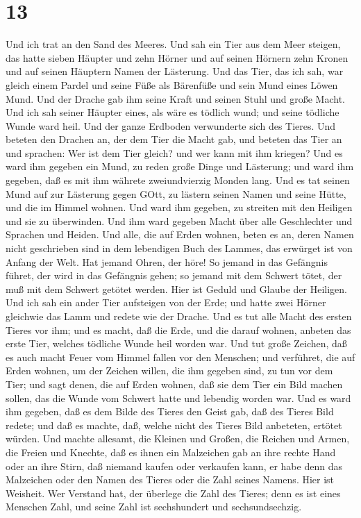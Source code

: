 \hypertarget{section-11}{%
\section{13}\label{section-11}}

 Und ich trat an den Sand des Meeres. Und sah ein Tier aus
dem Meer steigen, das hatte sieben Häupter und zehn Hörner und auf
seinen Hörnern zehn Kronen und auf seinen Häuptern Namen der Lästerung.
 Und das Tier, das ich sah, war gleich einem Pardel und
seine Füße als Bärenfüße und sein Mund eines Löwen Mund. Und der Drache
gab ihm seine Kraft und seinen Stuhl und große Macht.  Und
ich sah seiner Häupter eines, als wäre es tödlich wund; und seine
tödliche Wunde ward heil. Und der ganze Erdboden verwunderte sich des
Tieres.  Und beteten den Drachen an, der dem Tier die Macht
gab, und beteten das Tier an und sprachen: Wer ist dem Tier gleich? und
wer kann mit ihm kriegen?  Und es ward ihm gegeben ein Mund,
zu reden große Dinge und Lästerung; und ward ihm gegeben, daß es mit ihm
währete zweiundvierzig Monden lang.  Und es tat seinen Mund
auf zur Lästerung gegen GOtt, zu lästern seinen Namen und seine Hütte,
und die im Himmel wohnen.  Und ward ihm gegeben, zu streiten
mit den Heiligen und sie zu überwinden. Und ihm ward gegeben Macht über
alle Geschlechter und Sprachen und Heiden.  Und alle, die
auf Erden wohnen, beten es an, deren Namen nicht geschrieben sind in dem
lebendigen Buch des Lammes, das erwürget ist von Anfang der Welt.
 Hat jemand Ohren, der höre!  So jemand in das
Gefängnis führet, der wird in das Gefängnis gehen; so jemand mit dem
Schwert tötet, der muß mit dem Schwert getötet werden. Hier ist Geduld
und Glaube der Heiligen.  Und ich sah ein ander Tier
aufsteigen von der Erde; und hatte zwei Hörner gleichwie das Lamm und
redete wie der Drache.  Und es tut alle Macht des ersten
Tieres vor ihm; und es macht, daß die Erde, und die darauf wohnen,
anbeten das erste Tier, welches tödliche Wunde heil worden war.
 Und tut große Zeichen, daß es auch macht Feuer vom Himmel
fallen vor den Menschen;  und verführet, die auf Erden
wohnen, um der Zeichen willen, die ihm gegeben sind, zu tun vor dem
Tier; und sagt denen, die auf Erden wohnen, daß sie dem Tier ein Bild
machen sollen, das die Wunde vom Schwert hatte und lebendig worden war.
 Und es ward ihm gegeben, daß es dem Bilde des Tieres den
Geist gab, daß des Tieres Bild redete; und daß es machte, daß, welche
nicht des Tieres Bild anbeteten, ertötet würden.  Und
machte allesamt, die Kleinen und Großen, die Reichen und Armen, die
Freien und Knechte, daß es ihnen ein Malzeichen gab an ihre rechte Hand
oder an ihre Stirn,  daß niemand kaufen oder verkaufen
kann, er habe denn das Malzeichen oder den Namen des Tieres oder die
Zahl seines Namens.  Hier ist Weisheit. Wer Verstand hat,
der überlege die Zahl des Tieres; denn es ist eines Menschen Zahl, und
seine Zahl ist sechshundert und sechsundsechzig.

